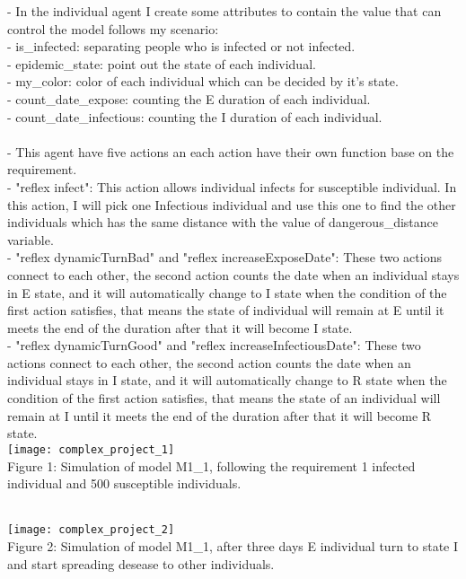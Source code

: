 \documentclass{article}
\begin{document}
- In the individual agent I create some attributes to contain the value that can control the model follows my scenario:
\\
- is\_infected: separating people who is infected or not infected.
\\
- epidemic\_state: point out the state of each individual.
\\
-	my\_color: color of each individual which can be decided by it's state.
\\
-	count\_date\_expose: counting the E duration of each individual.
\\
- count\_date\_infectious: counting the I duration of each individual.
\\\\
- This agent have five actions an each action have their own function base on the requirement.
\\
- "reflex infect": This action allows individual infects for susceptible individual. In this action, I will pick one Infectious individual and use this one to find the other individuals which has the same distance with the value of dangerous\_distance variable.
\\
- "reflex dynamicTurnBad" and "reflex increaseExposeDate": These two actions connect to each other, the second action counts the date when an individual stays in E state, and it will automatically change to I state when the condition of the first action satisfies, that means the state of individual will remain at E until it meets the end of the duration after that it will become I state.
\\
- "reflex dynamicTurnGood" and "reflex increaseInfectiousDate": These two actions connect to each other, the second action counts the date when an individual stays in I state, and it will automatically change to R state when the condition of the first action satisfies, that means the state of an individual will remain at I until it meets the end of the duration after that it will become R state.
\\
\texttt{[image: complex\_project\_1]}
\\
\caption{Figure 1: Simulation of model M1\_1, following the requirement 1 infected individual and 500 susceptible individuals.}
\\
\texttt{[image: complex\_project\_2]}
\\
\caption{Figure 2: Simulation of model M1\_1, after three days E individual turn to state I and start spreading desease to other individuals.}
\\
\end{document}

